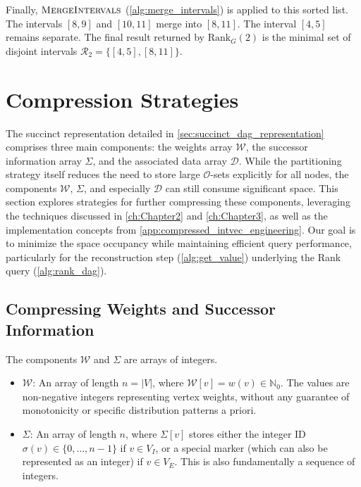 Finally, $\textsc{MergeIntervals}$ (\ref{alg:merge_intervals}) is applied to this sorted list. The intervals $[8, 9]$ and $[10, 11]$ merge into $[8, 11]$. The interval $[4, 5]$ remains separate. The final result returned by $\mathrm{Rank}_G(2)$ is the minimal set of disjoint intervals $\mathcal{R}_2 = \{ [4, 5], [8, 11] \}$.

\section{Compression Strategies}
\label{sec:compression_strategies}

The succinct representation detailed in \autoref{sec:succinct_dag_representation} comprises three main components: the weights array $\mathcal{W}$, the successor information array $\Sigma$, and the associated data array $\mathcal{D}$. While the partitioning strategy itself reduces the need to store large $\mathcal{O}$-sets explicitly for all nodes, the components $\mathcal{W}$, $\Sigma$, and especially $\mathcal{D}$ can still consume significant space. This section explores strategies for further compressing these components, leveraging the techniques discussed in \autoref{ch:Chapter2} and \autoref{ch:Chapter3}, as well as the implementation concepts from \autoref{app:compressed_intvec_engineering}. Our goal is to minimize the space occupancy while maintaining efficient query performance, particularly for the reconstruction step (\autoref{alg:get_value}) underlying the Rank query (\autoref{alg:rank_dag}).

\subsection{Compressing Weights and Successor Information}
\label{subsec:compressing_W_Sigma}

The components $\mathcal{W}$ and $\Sigma$ are arrays of integers.
\begin{itemize}
    \item $\mathcal{W}$: An array of length $n = |V|$, where $\mathcal{W}[v] = w(v) \in \mathbb{N}_0$. The values are non-negative integers representing vertex weights, without any guarantee of monotonicity or specific distribution patterns a priori.
    \item $\Sigma$: An array of length $n$, where $\Sigma[v]$ stores either the integer ID $\sigma(v) \in \{0, \dots, n-1\}$ if $v \in V_I$, or a special marker (which can also be represented as an integer) if $v \in V_E$. This is also fundamentally a sequence of integers.
\end{itemize}


